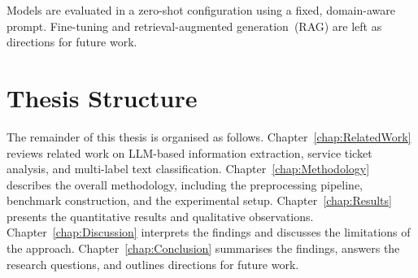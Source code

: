 Models are evaluated in a zero-shot configuration using a fixed, domain-aware prompt.
Fine-tuning and retrieval-augmented generation~(RAG) are left as directions for
future work.

\section{Thesis Structure}
\label{sec:structure}
%
The remainder of this thesis is organised as follows.
Chapter~\ref{chap:RelatedWork} reviews related work on LLM-based information
extraction, service ticket analysis, and multi-label text classification.
Chapter~\ref{chap:Methodology} describes the overall methodology, including the
preprocessing pipeline, benchmark construction, and the experimental setup.
Chapter~\ref{chap:Results} presents the quantitative results and qualitative
observations.
Chapter~\ref{chap:Discussion} interprets the findings and discusses the
limitations of the approach.
Chapter~\ref{chap:Conclusion} summarises the findings, answers the research
questions, and outlines directions for future work.
